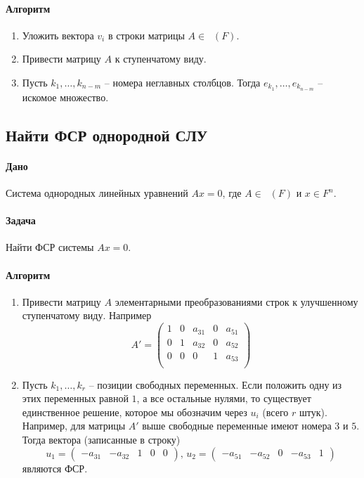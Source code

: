 \documentclass{article}
\newcommand{\MatrixDim}[3]{\mathop{\mathrm{M}_{#2\,#3}}(#1)}
\begin{document}
\paragraph{Алгоритм}
\begin{enumerate}
\item Уложить вектора $v_i$ в строки матрицы $A\in\MatrixDim{F}{m}{n}$.

\item Привести матрицу $A$ к ступенчатому виду.

\item Пусть $k_1,\ldots,k_{n-m}$ -- номера неглавных столбцов. Тогда $e_{k_1},\ldots,e_{k_{n-m}}$ -- искомое множество.
\end{enumerate}

\subsection{Найти ФСР однородной СЛУ}

\paragraph{Дано} Система однородных линейных уравнений $Ax = 0$, где $A\in \MatrixDim{F}{m}{n}$ и $x\in F^{n}$.

\paragraph{Задача} Найти ФСР системы $Ax = 0$.

\paragraph{Алгоритм}
\begin{enumerate}
\item Привести матрицу $A$ элементарными преобразованиями строк к улучшенному ступенчатому виду. Например
\[
A' = 
\begin{pmatrix}
{1}&{0}&{a_{31}}&{0}&{a_{51}}\\
{0}&{1}&{a_{32}}&{0}&{a_{52}}\\
{0}&{0}&{0}&{1}&{a_{53}}\\
\end{pmatrix}
\]

\item Пусть $k_1,\ldots,k_r$ -- позиции свободных переменных. Если положить одну из этих переменных равной $1$, а все остальные нулями, то существует единственное решение, которое мы обозначим через $u_i$ (всего $r$ штук). Например, для матрицы $A'$ выше свободные переменные имеют номера $3$ и $5$. Тогда вектора (записанные в строку)
\[
u_1 = 
\begin{pmatrix}
{-a_{31}}&{-a_{32}}&{1}&{0}&{0}
\end{pmatrix},\,
u_2 = 
\begin{pmatrix}
{-a_{51}}&{-a_{52}}&{0}&{-a_{53}}&{1}
\end{pmatrix}
\]
являются ФСР.
\end{enumerate}
\end{document}
